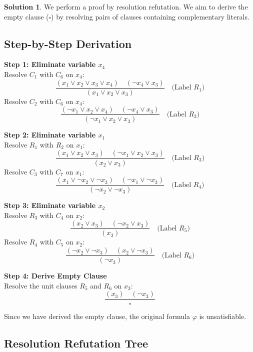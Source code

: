 \documentclass[12pt,a4paper]{article}
\theoremstyle{definition}
\newtheorem{solution}{Solution}
\begin{document}
\begin{solution}
We perform a proof by resolution refutation. We aim to derive the empty clause ($\square$) by resolving pairs of clauses containing complementary literals.

\subsection*{Step-by-Step Derivation}

\textbf{Step 1: Eliminate variable $x_4$} \\
Resolve $C_1$ with $C_6$ on $x_4$:
$$ \frac{(x_1 \lor x_2 \lor x_3 \lor x_4) \quad (\neg x_4 \lor x_3)}{(x_1 \lor x_2 \lor x_3)} \quad \text{(Label } R_1 \text{)} $$
Resolve $C_2$ with $C_6$ on $x_4$:
$$ \frac{(\neg x_1 \lor x_2 \lor x_4) \quad (\neg x_4 \lor x_3)}{(\neg x_1 \lor x_2 \lor x_3)} \quad \text{(Label } R_2 \text{)} $$

\textbf{Step 2: Eliminate variable $x_1$} \\
Resolve $R_1$ with $R_2$ on $x_1$:
$$ \frac{(x_1 \lor x_2 \lor x_3) \quad (\neg x_1 \lor x_2 \lor x_3)}{(x_2 \lor x_3)} \quad \text{(Label } R_3 \text{)} $$
Resolve $C_3$ with $C_7$ on $x_1$:
$$ \frac{(x_1 \lor \neg x_2 \lor \neg x_3) \quad (\neg x_1 \lor \neg x_3)}{(\neg x_2 \lor \neg x_3)} \quad \text{(Label } R_4 \text{)} $$

\textbf{Step 3: Eliminate variable $x_2$} \\
Resolve $R_3$ with $C_4$ on $x_2$:
$$ \frac{(x_2 \lor x_3) \quad (\neg x_2 \lor x_3)}{(x_3)} \quad \text{(Label } R_5 \text{)} $$
Resolve $R_4$ with $C_5$ on $x_2$:
$$ \frac{(\neg x_2 \lor \neg x_3) \quad (x_2 \lor \neg x_3)}{(\neg x_3)} \quad \text{(Label } R_6 \text{)} $$

\textbf{Step 4: Derive Empty Clause} \\
Resolve the unit clauses $R_5$ and $R_6$ on $x_3$:
$$ \frac{(x_3) \quad (\neg x_3)}{\square} $$

Since we have derived the empty clause, the original formula $\varphi$ is unsatisfiable.

\subsection*{Resolution Refutation Tree}

\begin{center}
\begin{tikzpicture}[
    level 1/.style={sibling distance=50mm},
    level 2/.style={sibling distance=30mm},
    level 3/.style={sibling distance=20mm},
    level 4/.style={sibling distance=15mm},
    every node/.style={draw, rectangle, rounded corners, align=center, inner sep=3pt, font=\small},
    edge from parent/.style={draw, ->}
]


\end{tikzpicture}
\end{center}
\end{solution}
\end{document}
